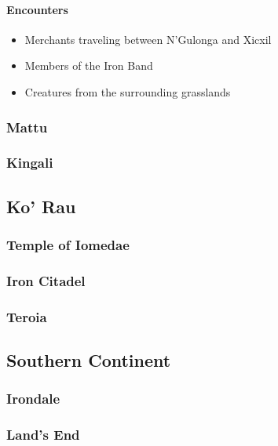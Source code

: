 			\paragraph{Encounters}
				\begin{itemize}
					\item Merchants traveling between N'Gulonga
						and Xicxil
					\item Members of the Iron Band
					\item Creatures from the surrounding grasslands
				\end{itemize}
				
		\subsubsection{Mattu}

		\subsubsection{Kingali}

	\subsection{Ko' Rau}

		\subsubsection{Temple of Iomedae}

		\subsubsection{Iron Citadel}

		\subsubsection{Teroia}

	\subsection{Southern Continent}

		\subsubsection{Irondale}

		\subsubsection{Land's End}

